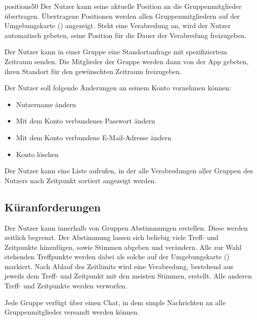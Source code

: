 \documentclass[parskip=full,11pt]{scrartcl}
\begin{document}
    {positions}{50}
%
Der Nutzer kann seine aktuelle Position an die Gruppenmitglieder übertragen.
Übertragene Positionen werden allen Gruppenmitgliedern auf der Umgebungskarte
() angezeigt.
Steht eine Verabredung an, wird der Nutzer automatisch gebeten, seine Position
für die Dauer der Verabredung freizugeben.

%
Der Nutzer kann in einer Gruppe eine Standortanfrage mit spezifiziertem
Zeitraum senden.
Die Mitglieder der Gruppe werden dann von der App gebeten,
ihren Standort für den gewünschten Zeitraum freizugeben.

%
Der Nutzer soll folgende Änderungen an seinem Konto vornehmen können:
\begin{itemize}
		\item Nutzername ändern
    \item Mit dem Konto verbundenes Passwort ändern
    \item Mit dem Konto verbundene E-Mail-Adresse ändern
    \item Konto löschen
\end{itemize}

%
%
Der Nutzer kann eine Liste aufrufen, in der alle Verabredungen aller Gruppen
des Nutzers nach Zeitpunkt sortiert angezeigt werden.

\subsection{Küranforderungen}

%
Der Nutzer kann innerhalb von Gruppen Abstimmungen erstellen.
Diese werden zeitlich begrenzt.
Der Abstimmung lassen sich beliebig viele Treff- und Zeitpunkte hinzufügen,
sowie Stimmen abgeben und verändern.
Alle zur Wahl stehenden Treffpunkte werden dabei als solche auf der
Umgebungskarte () markiert.
Nach Ablauf des Zeitlimits wird eine Verabredung, bestehend aus jeweils dem
Treff- und Zeitpunkt mit den meisten Stimmen, erstellt.
Alle anderen Treff- und Zeitpunkte werden verworfen.

%
Jede Gruppe verfügt über einen Chat, in dem simple Nachrichten an alle
Gruppenmitglieder versandt werden können.
\end{document}
